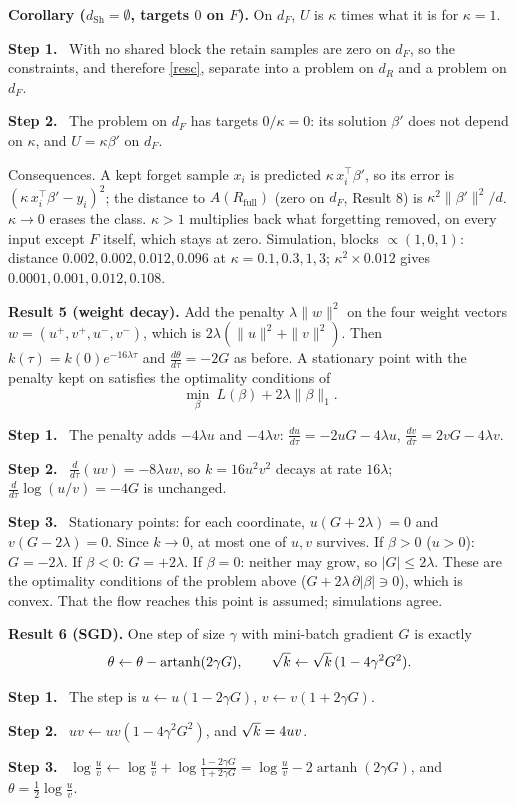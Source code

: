 \documentclass[10pt]{article}
\newcommand{\Rf}{R_{\mathrm{full}}}\newcommand{\Ff}{F_{\mathrm{full}}}\newcommand{\dSh}{d_{\mathrm{Sh}}}
\newcommand{\step}[1]{\par\smallskip\textbf{Step #1.}\ }
\begin{document}
\textbf{Corollary ($\dSh=\emptyset$, targets $0$ on $F$).} On $d_F$, $U$ is $\kappa$ times what it is for $\kappa=1$.
\step1 With no shared block the retain samples are zero on $d_F$, so the constraints, and therefore \eqref{resc}, separate into a problem on $d_R$ and a problem on $d_F$.
\step2 The problem on $d_F$ has targets $0/\kappa=0$: its solution $\beta'$ does not depend on $\kappa$, and $U=\kappa\beta'$ on $d_F$.

Consequences. A kept forget sample $x_i$ is predicted $\kappa\,x_i^\top\beta'$, so its error is $(\kappa\,x_i^\top\beta'-y_i)^2$; the distance to $A(\Rf)$ (zero on $d_F$, Result 8) is $\kappa^2\|\beta'\|^2/d$. $\kappa\to0$ erases the class. $\kappa>1$ multiplies back what forgetting removed, on every input except $F$ itself, which stays at zero. Simulation, blocks $\propto(1,0,1)$: distance $0.002,0.002,0.012,0.096$ at $\kappa=0.1,0.3,1,3$; $\kappa^2\times0.012$ gives $0.0001,0.001,0.012,0.108$.

\textbf{Result 5 (weight decay).} Add the penalty $\lambda\|w\|^2$ on the four weight vectors $w=(u^+,v^+,u^-,v^-)$, which is $2\lambda(\|u\|^2+\|v\|^2)$. Then $k(\tau)=k(0)e^{-16\lambda\tau}$ and $\frac{d\theta}{d\tau}=-2G$ as before. A stationary point with the penalty kept on satisfies the optimality conditions of
\[
\min_\beta\ L(\beta)+2\lambda\|\beta\|_1 .
\]
\step1 The penalty adds $-4\lambda u$ and $-4\lambda v$: $\frac{du}{d\tau}=-2uG-4\lambda u$, $\frac{dv}{d\tau}=2vG-4\lambda v$.
\step2 $\frac d{d\tau}(uv)=-8\lambda uv$, so $k=16u^2v^2$ decays at rate $16\lambda$; $\frac d{d\tau}\log(u/v)=-4G$ is unchanged.
\step3 Stationary points: for each coordinate, $u(G+2\lambda)=0$ and $v(G-2\lambda)=0$. Since $k\to0$, at most one of $u,v$ survives. If $\beta>0$ ($u>0$): $G=-2\lambda$. If $\beta<0$: $G=+2\lambda$. If $\beta=0$: neither may grow, so $|G|\le2\lambda$. These are the optimality conditions of the problem above ($G+2\lambda\,\partial|\beta|\ni0$), which is convex. That the flow reaches this point is assumed; simulations agree.

\textbf{Result 6 (SGD).} One step of size $\gamma$ with mini-batch gradient $G$ is exactly
\[
\theta\leftarrow\theta-\operatorname{artanh}(2\gamma G),\qquad \sqrt k\leftarrow\sqrt k\,(1-4\gamma^2G^2).
\]
\step1 The step is $u\leftarrow u(1-2\gamma G)$, $v\leftarrow v(1+2\gamma G)$.
\step2 $uv\leftarrow uv(1-4\gamma^2G^2)$, and $\sqrt k=4uv$.
\step3 $\log\frac uv\leftarrow\log\frac uv+\log\frac{1-2\gamma G}{1+2\gamma G}=\log\frac uv-2\operatorname{artanh}(2\gamma G)$, and $\theta=\frac12\log\frac uv$.
\end{document}
